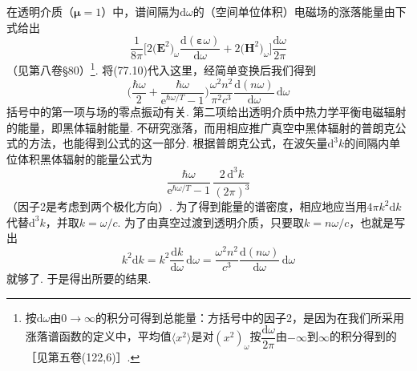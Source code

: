 在透明介质（$\bm{\mu}=1$）中，谱间隔为$\mathrm{d}\omega$的（空间单位体积）电磁场的涨落能量由下式给出
\begin{equation*}
\frac{1}{8\pi}\biggl[2\bigl(\bm{E}^{2}\bigr)_{\omega}\frac{\mathrm{d}(\bm{\varepsilon}\omega)}{\mathrm{d}\omega}+2\bigl(\bm{H}^{2}\bigr)_{\omega}\biggr]\frac{\mathrm{d}\omega}{2\pi}
\end{equation*}
（见第八卷§80）\footnote{按$\mathrm{d}\omega$由$0\to\infty$的积分可得到总能量：方括号中的因子2，是因为在我们所采用涨落谱函数的定义中，平均值$\langle x^2\rangle$是对$(x^2)_\omega$按$\dfrac{\mathrm{d}\omega}{2\pi}$由$-\infty$到$\infty$的积分得到的［见第五卷(122,6)］.}. 将(77.10)代入这里，经简单变换后我们得到
\begin{equation}
\biggl(\frac{\hbar\omega}{2}+\frac{\hbar\omega}{\mathrm{e}^{\hbar\omega/T}-1}\biggr)\frac{\omega^{2}n^{2}}{\pi^{2}c^{3}}\frac{\mathrm{d}(n\omega)}{\mathrm{d}\omega}\,\mathrm{d}\omega
\end{equation}
括号中的第一项与场的零点振动有关. 第二项给出透明介质中热力学平衡电磁辐射的能量，即黑体辐射能量. 不研究涨落，而用相应推广真空中黑体辐射的普朗克公式的方法，也能得到公式的这一部分. 根据普朗克公式，在波矢量$\mathrm{d}^{3}k$的间隔内单位体积黑体辐射的能量公式为
\begin{equation*}
\frac{\hbar\omega}{\mathrm{e}^{\hbar\omega/T}-1}\,\frac{2\,\mathrm{d}^{3}k}{(2\pi)^{3}}
\end{equation*}
（因子2是考虑到两个极化方向）. 为了得到能量的谱密度，相应地应当用$4\pi k^{2}\mathrm{d}k$代替$\mathrm{d}^{3}k$，并取$k=\omega/c$. 为了由真空过渡到透明介质，只要取$k=n\omega/c$，也就是写出
\begin{equation*}
k^{2}\mathrm{d}k=k^{2}\frac{\mathrm{d}k}{\mathrm{d}\omega}\,\mathrm{d}\omega=\frac{\omega^{2}n^{2}}{c^{3}}\frac{\mathrm{d}(n\omega)}{\mathrm{d}\omega}\,\mathrm{d}\omega
\end{equation*}
就够了. 于是得出所要的结果.

